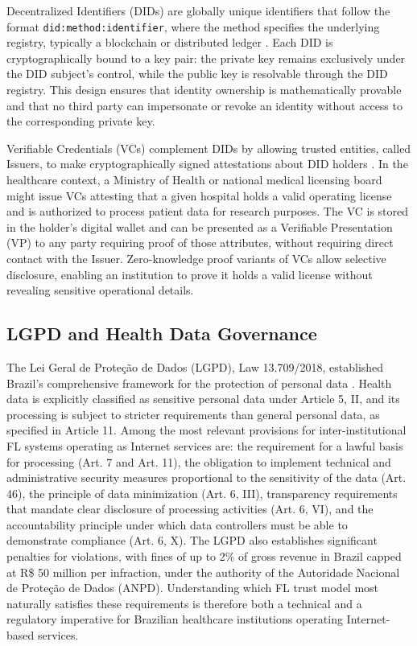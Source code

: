 \documentclass{sbc2023}
\begin{document}
Decentralized Identifiers (DIDs) are globally unique identifiers that follow the format \texttt{did:method:identifier}, where the method specifies the underlying registry, typically a blockchain or distributed ledger \citep{W3C_DID_2022}. Each DID is cryptographically bound to a key pair: the private key remains exclusively under the DID subject's control, while the public key is resolvable through the DID registry. This design ensures that identity ownership is mathematically provable and that no third party can impersonate or revoke an identity without access to the corresponding private key.

Verifiable Credentials (VCs) complement DIDs by allowing trusted entities, called Issuers, to make cryptographically signed attestations about DID holders \citep{W3C2019}. In the healthcare context, a Ministry of Health or national medical licensing board might issue VCs attesting that a given hospital holds a valid operating license and is authorized to process patient data for research purposes. The VC is stored in the holder's digital wallet and can be presented as a Verifiable Presentation (VP) to any party requiring proof of those attributes, without requiring direct contact with the Issuer. Zero-knowledge proof variants of VCs allow selective disclosure, enabling an institution to prove it holds a valid license without revealing sensitive operational details.

\subsection{LGPD and Health Data Governance}

The Lei Geral de Prote\c{c}\~{a}o de Dados (LGPD), Law 13.709/2018, established Brazil's comprehensive framework for the protection of personal data \citep{LGPD2018}. Health data is explicitly classified as sensitive personal data under Article 5, II, and its processing is subject to stricter requirements than general personal data, as specified in Article 11. Among the most relevant provisions for inter-institutional FL systems operating as Internet services are: the requirement for a lawful basis for processing (Art. 7 and Art. 11), the obligation to implement technical and administrative security measures proportional to the sensitivity of the data (Art. 46), the principle of data minimization (Art. 6, III), transparency requirements that mandate clear disclosure of processing activities (Art. 6, VI), and the accountability principle under which data controllers must be able to demonstrate compliance (Art. 6, X). The LGPD also establishes significant penalties for violations, with fines of up to 2\% of gross revenue in Brazil capped at R\$ 50 million per infraction, under the authority of the Autoridade Nacional de Prote\c{c}\~{a}o de Dados (ANPD). Understanding which FL trust model most naturally satisfies these requirements is therefore both a technical and a regulatory imperative for Brazilian healthcare institutions operating Internet-based services.
\end{document}
